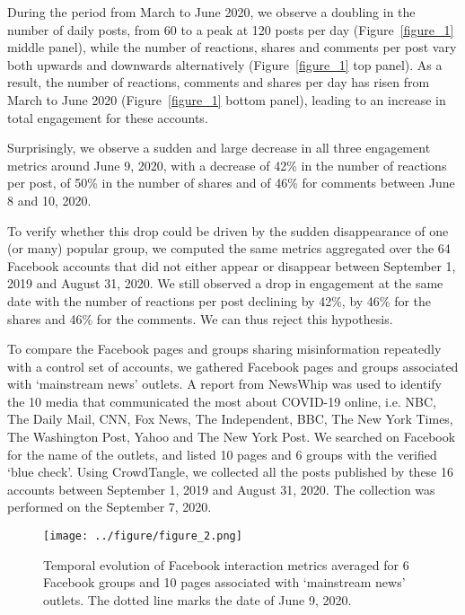 \documentclass[sigconf]{acmart}
\begin{document}
During the period from March to June 2020, we observe a doubling in the number of daily posts, from 60 to a peak at 120 posts per day (Figure~\ref{figure_1} middle panel), while the number of reactions, shares and comments per post vary both upwards and downwards alternatively (Figure~\ref{figure_1} top panel). As a result, the number of reactions, comments and shares per day has risen from March to June 2020 (Figure~\ref{figure_1} bottom panel), leading to an increase in total engagement for these accounts.

Surprisingly, we observe a sudden and large decrease in all three engagement metrics around June 9, 2020, with a decrease of 42\% in the number of reactions per post, of 50\% in the number of shares and of 46\% for comments between June 8 and 10, 2020.

To verify whether this drop could be driven by the sudden disappearance of one (or many) popular group, we computed the same metrics aggregated over the 64 Facebook accounts that did not either appear or disappear between September 1, 2019 and August 31, 2020. We still observed a drop in engagement at the same date with the number of reactions per post declining by 42\%, by 46\% for the shares and 46\% for the comments. We can thus reject this hypothesis.

To compare the Facebook pages and groups sharing misinformation repeatedly with a control set of accounts, we gathered Facebook pages and groups associated with `mainstream news' outlets. A report from NewsWhip \cite{NewsWhip} was used to identify the 10 media that communicated the most about COVID-19 online, i.e. NBC, The Daily Mail, CNN, Fox News, The Independent, BBC, The New York Times, The Washington Post, Yahoo and The New York Post. We searched on Facebook for the name of the outlets, and listed 10 pages and 6 groups with the verified `blue check'. Using CrowdTangle, we collected all the posts published by these 16 accounts between September 1, 2019 and August 31, 2020. The collection was performed on the September 7, 2020.

\begin{figure}[h]
  \centering
  \texttt{[image: ../figure/figure\_2.png]}
  \caption{Temporal evolution of Facebook interaction metrics averaged for 6 Facebook groups and 10 pages associated with `mainstream news' outlets. The dotted line marks the date of June 9, 2020.}
  \label{figure_2}
\end{figure}
\end{document}
